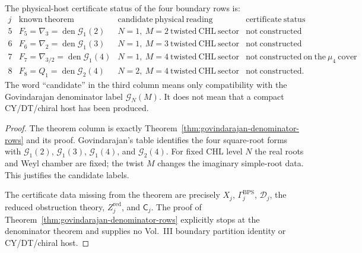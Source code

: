 \begin{theorem}
The physical-host certificate status of the four boundary rows is:
\[
\begin{array}{c|c|c|c}
j&\mathrm{known\ theorem}&\mathrm{candidate\ physical\ reading}
&\mathrm{certificate\ status}\\ \hline
5&F_5=\nabla_3=\operatorname{den}\mathcal G_1(2)
&N=1,\ M=2\ \mathrm{twisted\ CHL\ sector}
&\mathrm{not\ constructed}\\
6&F_6=\nabla_2=\operatorname{den}\mathcal G_1(3)
&N=1,\ M=3\ \mathrm{twisted\ CHL\ sector}
&\mathrm{not\ constructed}\\
7&F_7=\nabla_{3/2}=\operatorname{den}\mathcal G_1(4)
&N=1,\ M=4\ \mathrm{twisted\ CHL\ sector}
&\mathrm{not\ constructed\ on\ the\ }\mu_4\mathrm{\ cover}\\
8&F_8=Q_1=\operatorname{den}\mathcal G_2(4)
&N=2,\ M=4\ \mathrm{twisted\ CHL\ sector}
&\mathrm{not\ constructed}.
\end{array}
\]
The word ``candidate'' in the third column means only compatibility with
the Govindarajan denominator label \(\mathcal G_N(M)\).  It does not mean
that a compact CY/DT/chiral host has been produced.
\end{theorem}

\begin{proof}
The theorem column is exactly Theorem~\ref{thm:govindarajan-denominator-rows}
and its proof.  Govindarajan's table identifies the four square-root
forms with \(\mathcal G_1(2)\), \(\mathcal G_1(3)\),
\(\mathcal G_1(4)\), and \(\mathcal G_2(4)\).  For fixed CHL level \(N\)
the real roots and Weyl chamber are fixed; the twist \(M\) changes the
imaginary simple-root data.  This justifies the candidate labels.

The certificate data missing from the theorem are precisely \(X_j\),
\(\Gamma_j^{\mathrm{BPS}}\), \(\mathscr D_j\), the reduced obstruction
theory, \(Z_j^{\mathrm{red}}\), and \(\mathsf C_j\).  The proof of
Theorem~\ref{thm:govindarajan-denominator-rows} explicitly stops at
the denominator theorem and supplies no Vol.~III boundary partition
identity or CY/DT/chiral host.
\end{proof}

